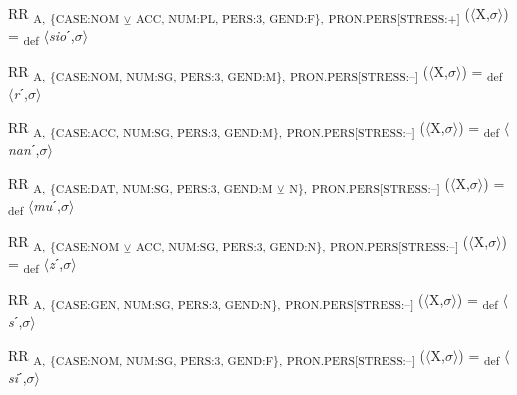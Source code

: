 {\begin{exe}
 RR \textsubscript{A,} \textsubscript{\{CASE:NOM} \textsubscript{${\veebar}$} \textsubscript{ACC, NUM:PL, PERS:3, GEND:F\},} \textsubscript{PRON.PERS[STRESS:+]} ($\langle$X,$\sigma $$\rangle$) = \textsubscript{def} $\langle$\textit{sio}ˊ,$\sigma $$\rangle$
\end{exe}

\begin{exe}
 RR \textsubscript{A,} \textsubscript{\{CASE:NOM, NUM:SG, PERS:3, GEND:M\},} \textsubscript{PRON.PERS[STRESS:–]} ($\langle$X,$\sigma $$\rangle$) = \textsubscript{def} $\langle$\textit{r}ˊ,$\sigma $$\rangle$
\end{exe}

\begin{exe}
 RR \textsubscript{A,} \textsubscript{\{CASE:ACC, NUM:SG, PERS:3, GEND:M\},} \textsubscript{PRON.PERS[STRESS:–]} ($\langle$X,$\sigma $$\rangle$) = \textsubscript{def} $\langle$\textit{nan}ˊ,$\sigma $$\rangle$
\end{exe}

\begin{exe}
 RR \textsubscript{A,} \textsubscript{\{CASE:DAT, NUM:SG, PERS:3, GEND:M} \textsubscript{${\veebar}$} \textsubscript{N\},} \textsubscript{PRON.PERS[STRESS:–]} ($\langle$X,$\sigma $$\rangle$) = \textsubscript{def} $\langle$\textit{mu}ˊ,$\sigma $$\rangle$
\end{exe}

\begin{exe}
 RR \textsubscript{A,} \textsubscript{\{CASE:NOM} \textsubscript{${\veebar}$} \textsubscript{ACC, NUM:SG, PERS:3, GEND:N\},} \textsubscript{PRON.PERS[STRESS:–]} ($\langle$X,$\sigma $$\rangle$) = \textsubscript{def} $\langle$\textit{z}ˊ,$\sigma $$\rangle$
\end{exe}

\begin{exe}
 RR \textsubscript{A,} \textsubscript{\{CASE:GEN, NUM:SG, PERS:3, GEND:N\},} \textsubscript{PRON.PERS[STRESS:–]} ($\langle$X,$\sigma $$\rangle$) = \textsubscript{def} $\langle$\textit{s}ˊ,$\sigma $$\rangle$
\end{exe}

\begin{exe}
 RR \textsubscript{A,} \textsubscript{\{CASE:NOM, NUM:SG, PERS:3, GEND:F\},} \textsubscript{PRON.PERS[STRESS:–]} ($\langle$X,$\sigma $$\rangle$) = \textsubscript{def} $\langle$\textit{si}ˊ,$\sigma $$\rangle$
\end{exe}

}
